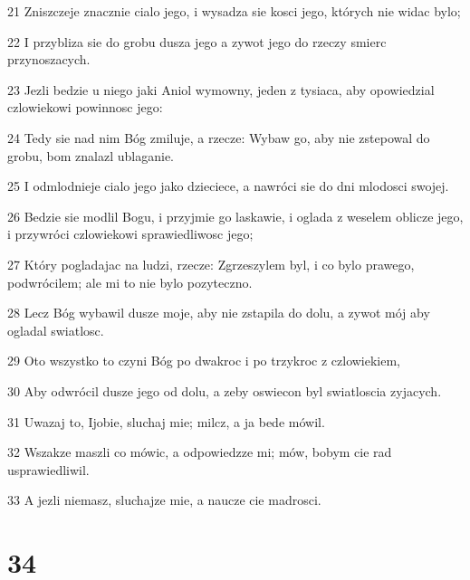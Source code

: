 \par 21 Zniszczeje znacznie cialo jego, i wysadza sie kosci jego, których nie widac bylo;
\par 22 I przybliza sie do grobu dusza jego a zywot jego do rzeczy smierc przynoszacych.
\par 23 Jezli bedzie u niego jaki Aniol wymowny, jeden z tysiaca, aby opowiedzial czlowiekowi powinnosc jego:
\par 24 Tedy sie nad nim Bóg zmiluje, a rzecze: Wybaw go, aby nie zstepowal do grobu, bom znalazl ublaganie.
\par 25 I odmlodnieje cialo jego jako dzieciece, a nawróci sie do dni mlodosci swojej.
\par 26 Bedzie sie modlil Bogu, i przyjmie go laskawie, i oglada z weselem oblicze jego, i przywróci czlowiekowi sprawiedliwosc jego;
\par 27 Który pogladajac na ludzi, rzecze: Zgrzeszylem byl, i co bylo prawego, podwrócilem; ale mi to nie bylo pozyteczno.
\par 28 Lecz Bóg wybawil dusze moje, aby nie zstapila do dolu, a zywot mój aby ogladal swiatlosc.
\par 29 Oto wszystko to czyni Bóg po dwakroc i po trzykroc z czlowiekiem,
\par 30 Aby odwrócil dusze jego od dolu, a zeby oswiecon byl swiatloscia zyjacych.
\par 31 Uwazaj to, Ijobie, sluchaj mie; milcz, a ja bede mówil.
\par 32 Wszakze maszli co mówic, a odpowiedzze mi; mów, bobym cie rad usprawiedliwil.
\par 33 A jezli niemasz, sluchajze mie, a naucze cie madrosci.

\chapter{34}

